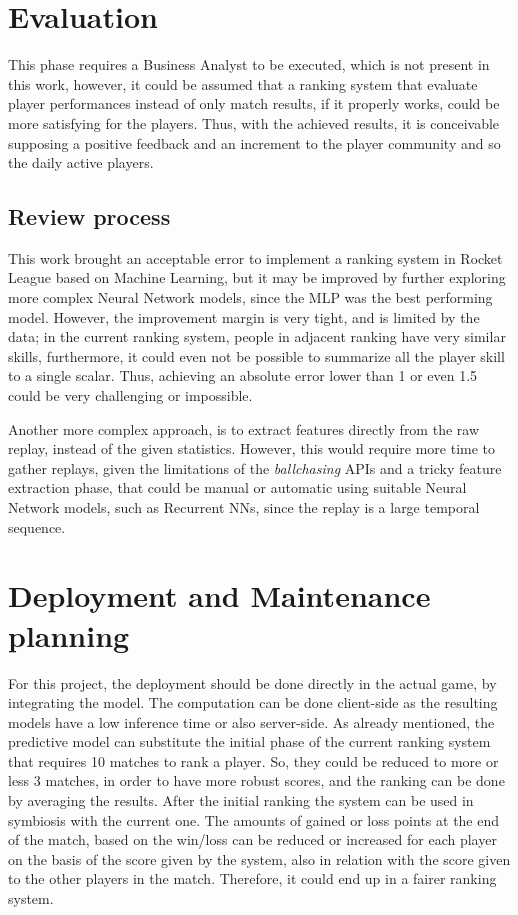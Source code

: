 \section{Evaluation}

This phase requires a Business Analyst to be executed, which is not present in this work, however, it could be assumed that a ranking system that evaluate player performances instead of only match results, if it properly works, could be more satisfying for the players. Thus, with the achieved results, it is conceivable supposing a positive feedback and an increment to the player community and so the daily active players.
\subsection{Review process}

This work brought an acceptable error to implement a ranking system in Rocket League based on Machine Learning, but it may be improved by further exploring more complex Neural Network models, since the MLP was the best performing model. However, the improvement margin is very tight, and is limited by the data; in the current ranking system, people in adjacent ranking have very similar skills, furthermore, it could even not be possible to summarize all the player skill to a single scalar. Thus, achieving an absolute error lower than 1 or even 1.5 could be very challenging or impossible.

Another more complex approach, is to extract features directly from the raw replay, instead of the given statistics. However, this would require more time to gather replays, given the limitations of the \textit{ballchasing} APIs and a tricky feature extraction phase, that could be manual or automatic using suitable Neural Network models, such as Recurrent NNs, since the replay is a large temporal sequence.


\section{Deployment and Maintenance planning}

For this project, the deployment should be done directly in the actual game, by integrating the model. The computation can be done client-side as the resulting models have a low inference time or also server-side. As already mentioned, the predictive model can substitute the initial phase of the current ranking system that requires 10 matches to rank a player. So, they could be reduced to more or less 3 matches, in order to have more robust scores, and the ranking can be done by averaging the results. After the initial ranking the system can be used in symbiosis with the current one. The amounts of gained or loss points at the end of the match, based on the win/loss can be reduced or increased for each player on the basis of the score given by the system, also in relation with the score given to the other players in the match. Therefore, it could end up in a fairer ranking system.

